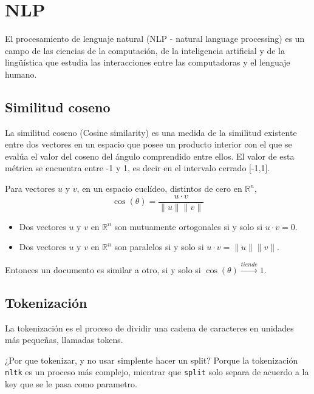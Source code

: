 \documentclass[../main.tex]{subfiles}
\begin{document}
\section{NLP}
    El procesamiento de lenguaje natural (NLP - natural language processing) es un campo de las ciencias de la computación, de la inteligencia artificial y de la lingüística que estudia las interacciones entre las computadoras y el lenguaje humano.


    \subsection{Similitud coseno}
        La similitud coseno (Cosine similarity) es una medida de la similitud existente entre dos vectores en un espacio que posee un producto interior con el que se evalúa el valor del coseno del ángulo comprendido entre ellos. 
        El valor de esta métrica se encuentra entre -1 y 1, es decir en el intervalo cerrado [-1,1].

        \begin{definition}
            Para vectores $u$ y $v$, en un espacio euclídeo, distintos de cero en $\mathbb{R}^n$,
            \begin{equation}
                \cos(\theta) = \frac{u \cdot v}{\|u\| \|v\|}
            \end{equation}

            \begin{itemize}
                \item Dos vectores $u$ y $v$ en $\mathbb{R}^n$ son mutuamente ortogonales si y solo si $u \cdot v = 0$.
                \item Dos vectores $u$ y $v$ en $\mathbb{R}^n$ son paralelos si y solo si $u \cdot v = \|u\| \|v\|$.
            \end{itemize}

            Entonces un documento es similar a otro, si y solo si $\cos(\theta) \overset{tiende}{\longrightarrow} 1$.
        \end{definition}

    \subsection{Tokenización}
        La tokenización es el proceso de dividir una cadena de caracteres en unidades más pequeñas, llamadas tokens. 
    
        ¿Por que tokenizar, y no usar simplente hacer un split? Porque la tokenización \texttt{nltk} es un proceso más complejo, mientrar que \texttt{split} solo separa de acuerdo a la key que se le pasa como parametro.
\end{document}
